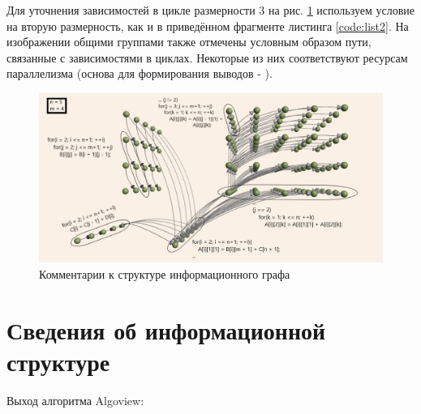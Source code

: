 \documentclass[12pt, fleqn]{article}
\theoremstyle{definition}
\begin{document}
Для уточнения зависимостей в цикле размерности 3 на рис.  \ref{fig:main} используем условие на вторую размерность, как и в приведённом фрагменте листинга \ref{code:list2}. На изображении общими группами также отмечены условным образом пути, связанные с зависимостями в циклах. Некоторые из них соответствуют ресурсам параллелизма (основа для формирования выводов - \cite{math_ground}).
\begin{figure}[ht]
\begin{center}
 \includegraphics[scale=0.575]{main.png}
 \caption{Комментарии к структуре информационного графа}
 \label{fig:main}
\end{center}
\end{figure}

\section{Сведения об информационной структуре}
Выход алгоритма Algoview: 
\end{document}
